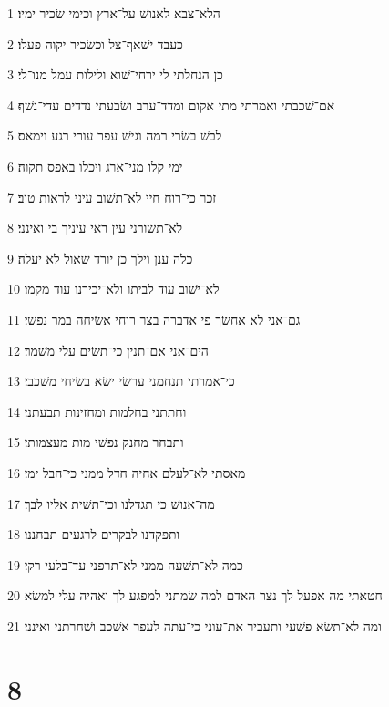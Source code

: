 \par 1 הלא־צבא לאנושׁ על־ארץ וכימי שׂכיר ימיו׃
\par 2 כעבד ישׁאף־צל וכשׂכיר יקוה פעלו׃
\par 3 כן הנחלתי לי ירחי־שׁוא ולילות עמל מנו־לי׃
\par 4 אם־שׁכבתי ואמרתי מתי אקום ומדד־ערב ושׂבעתי נדדים עדי־נשׁף׃
\par 5 לבשׁ בשׂרי רמה וגישׁ עפר עורי רגע וימאס׃
\par 6 ימי קלו מני־ארג ויכלו באפס תקוה׃
\par 7 זכר כי־רוח חיי לא־תשׁוב עיני לראות טוב׃
\par 8 לא־תשׁורני עין ראי עיניך בי ואינני׃
\par 9 כלה ענן וילך כן יורד שׁאול לא יעלה׃
\par 10 לא־ישׁוב עוד לביתו ולא־יכירנו עוד מקמו׃
\par 11 גם־אני לא אחשׂך פי אדברה בצר רוחי אשׂיחה במר נפשׁי׃
\par 12 הים־אני אם־תנין כי־תשׂים עלי משׁמר׃
\par 13 כי־אמרתי תנחמני ערשׂי ישׂא בשׂיחי משׁכבי׃
\par 14 וחתתני בחלמות ומחזינות תבעתני׃
\par 15 ותבחר מחנק נפשׁי מות מעצמותי׃
\par 16 מאסתי לא־לעלם אחיה חדל ממני כי־הבל ימי׃
\par 17 מה־אנושׁ כי תגדלנו וכי־תשׁית אליו לבך׃
\par 18 ותפקדנו לבקרים לרגעים תבחננו׃
\par 19 כמה לא־תשׁעה ממני לא־תרפני עד־בלעי רקי׃
\par 20 חטאתי מה אפעל לך נצר האדם למה שׂמתני למפגע לך ואהיה עלי למשׂא׃
\par 21 ומה לא־תשׂא פשׁעי ותעביר את־עוני כי־עתה לעפר אשׁכב ושׁחרתני ואינני׃

\chapter{8}

